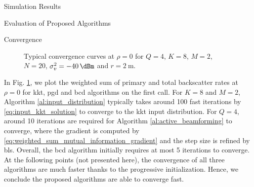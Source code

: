 \documentclass[journal]{IEEEtran}
\begin{document}
\begin{section}{Simulation Results}
\begin{subsection}{Evaluation of Proposed Algorithms}
		\begin{subsubsection}{Convergence}
			\begin{figure}[!t]
				\centering
				\resizebox{0.75\columnwidth}{!}{
					
				}
				\caption{Typical convergence curves at $\rho=0$ for $Q=4$, $K=8$, $M=2$, $N=20$, $\sigma_v^2=\qty{-40}{\dBm}$ and $r=\qty{2}{\meter}$.}
				\label{fg:wsr_convergence}
			\end{figure}

			In Fig. \ref{fg:wsr_convergence}, we plot the weighted sum of primary and total backscatter rates at $\rho=0$ for \gls{kkt}, \gls{pgd} and \gls{bcd} algorithms on the first call.
			For $K=8$ and $M=2$, Algorithm \ref{al:input_distribution} typically takes around \num{100} fast iterations by \eqref{eq:input_kkt_solution} to converge to the \gls{kkt} input distribution.
			For $Q=4$, around \num{10} iterations are required for Algorithm \ref{al:active_beamforming} to converge, where the gradient is computed by \eqref{eq:weighted_sum_mutual_information_gradient} and the step size is refined by \gls{bls}.
			Overall, the \gls{bcd} algorithm initially requires at most \num{5} iterations to converge.
			At the following points (not presented here), the convergence of all three algorithms are much faster thanks to the progressive initialization.
			Hence, we conclude the proposed algorithms are able to converge fast.
		\end{subsubsection}
	\end{subsection}


\end{section}
\end{document}
